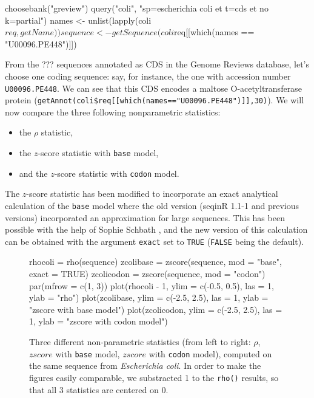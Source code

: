 \documentclass{article}
\begin{document}
\begin{Schunk}
\begin{Sinput}
 choosebank("greview")
 query("coli", "sp=escherichia coli et t=cds et no k=partial")
 names <- unlist(lapply(coli$req, getName))
 sequence <- getSequence(coli$req[[which(names == "U00096.PE448")]])
\end{Sinput}
\end{Schunk}

From the ??? sequences
annotated as CDS in the Genome Reviews database, let's choose one
coding sequence: say, for instance, the one with accession number \texttt{U00096.PE448}. We can see
that this CDS encodes a maltose O-acetyltransferase protein
(\verb+getAnnot(coli$req[[which(names=="U00096.PE448")]],30)+). We will now compare the three
following nonparametric statistics:

\begin{itemize}
\item the $\rho$ statistic,
\item the $z$-score statistic with \texttt{base} model,
\item and the $z$-score statistic with \texttt{codon} model.
\end{itemize}

The $z$-score statistic has been modified to incorporate an exact
analytical calculation of the \texttt{base} model where the old 
version (seqinR 1.1-1 and previous versions) incorporated an
approximation for large sequences. This has been possible with the
help of Sophie Schbath \cite{Schbath-thesis}, and the new version of
this calculation can be obtained with the argument \texttt{exact} 
set to \texttt{TRUE} (\texttt{FALSE} being the default).

\begin{figure}[H]
  \begin{center}
\begin{Schunk}
\begin{Sinput}
 rhocoli = rho(sequence)
 zcolibase = zscore(sequence, mod = "base", exact = TRUE)
 zcolicodon = zscore(sequence, mod = "codon")
 par(mfrow = c(1, 3))
 plot(rhocoli - 1, ylim = c(-0.5, 0.5), las = 1, ylab = "rho")
 plot(zcolibase, ylim = c(-2.5, 2.5), las = 1, ylab = "zscore with base model")
 plot(zcolicodon, ylim = c(-2.5, 2.5), las = 1, ylab = "zscore with codon model")
\end{Sinput}
\end{Schunk}
\end{center}
   \caption{Three different non-parametric statistics (from left to
   right: $\rho$, $zscore$ with \texttt{base} model, $zscore$ with
   \texttt{codon} model), computed on the same sequence from
   \textit{Escherichia coli}. In order to make the figures easily
   comparable, we substracted 1 to the \texttt{rho()} results, so that
   all 3 statistics are centered on 0. }
\label{dinuclcoli}
\end{figure}
\end{document}
